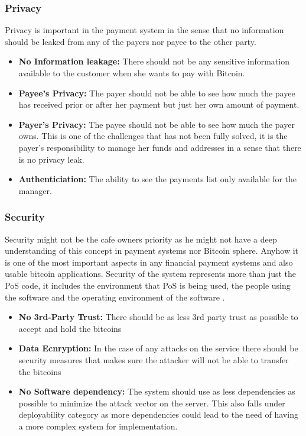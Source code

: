 \subsubsection{Privacy} Privacy is important in the payment system in the sense that no information should be leaked from any of the payers nor payee to the other party.
\begin{itemize}

\item \textbf{No Information leakage: }There should not be any sensitive information available to the customer when she wants to pay with Bitcoin.

\item \textbf{Payee's Privacy: }The payer should not be able to see how much the payee has received prior or after her payment but just her own amount of payment.

\item \textbf{Payer's Privacy: }The payee should not be able to see how much the payer owns. This is one of the challenges that has not been fully solved, it is the payer's responsibility to manage her funds and addresses in a sense that there is no privacy leak.

\item \textbf{Authenticiation: }The ability to see the payments list only available for the manager.

\end{itemize}
\subsubsection{Security} Security might not be the cafe owners priority as he might not have a deep understanding of this concept in payment systems nor Bitcoin sphere. Anyhow it is one of the most important aspects in any financial payment systems and also usable bitcoin applications. Security of the system represents more than just the PoS code, it includes the environment that PoS is being used, the people using the software and the operating environment of the software \cite{securityreq}.
\begin{itemize}

\item \textbf{No 3rd-Party Trust: }There should be as less 3rd party trust as possible to accept and hold the bitcoins

\item \textbf{Data Ecnryption: }In the case of any attacks on the service there should be security measures that makes sure the attacker will not be able to transfer the bitcoins

\item \textbf{No Software dependency: }The system should use as less dependencies as possible to minimize the attack vector on the server. This also falls under deployability category as more dependencies could lead to the need of having a more complex system for implementation. %

\end{itemize}

